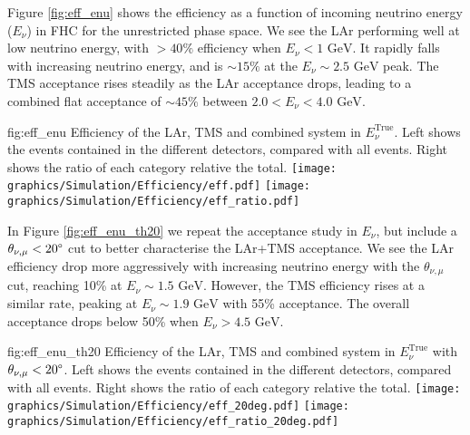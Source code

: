 Figure \ref{fig:eff_enu} shows the efficiency as a function of incoming neutrino energy ($E_\nu$) in FHC for the unrestricted phase space. We see the LAr performing well at low neutrino energy, with $>40\%$ efficiency when $E_\nu < 1 \text{ GeV}$. It rapidly falls with increasing neutrino energy, and is $\sim15\%$ at the $E_\nu\sim 2.5\text{ GeV}$ peak. The TMS acceptance rises steadily as the LAr acceptance drops, leading to a combined flat acceptance of $\sim45\%$ between $2.0<E_\nu<4.0\text{ GeV}$.
\begin{dunefigure}[]{fig:eff_enu}
{Efficiency of the LAr, TMS and combined system in $E_\nu^\text{True}$. Left shows the events contained in the different detectors, compared with all events. Right shows the ratio of each category relative the total.}
\texttt{[image: graphics/Simulation/Efficiency/eff.pdf]} \texttt{[image: graphics/Simulation/Efficiency/eff\_ratio.pdf]}
\end{dunefigure}

In Figure \ref{fig:eff_enu_th20} we repeat the acceptance study in $E_\nu$, but include a $\theta_{\nu,\mu}<20\degree$ cut to better characterise the LAr+TMS acceptance. We see the LAr efficiency drop more aggressively with increasing neutrino energy with the $\theta_{\nu,\mu}$ cut, reaching 10\% at $E_\nu\sim 1.5\text{ GeV}$. However, the TMS efficiency rises at a similar rate, peaking at $E_\nu\sim1.9\text{ GeV}$ with 55\% acceptance. The overall acceptance drops below 50\% when $E_\nu>4.5\text{ GeV}$.
\begin{dunefigure}[]{fig:eff_enu_th20}
{Efficiency of the LAr, TMS and combined system in $E_\nu^\text{True}$ with $\theta_{\nu,\mu}<20\degree$. Left shows the events contained in the different detectors, compared with all events. Right shows the ratio of each category relative the total.}
\texttt{[image: graphics/Simulation/Efficiency/eff\_20deg.pdf]} \texttt{[image: graphics/Simulation/Efficiency/eff\_ratio\_20deg.pdf]}
\end{dunefigure}

